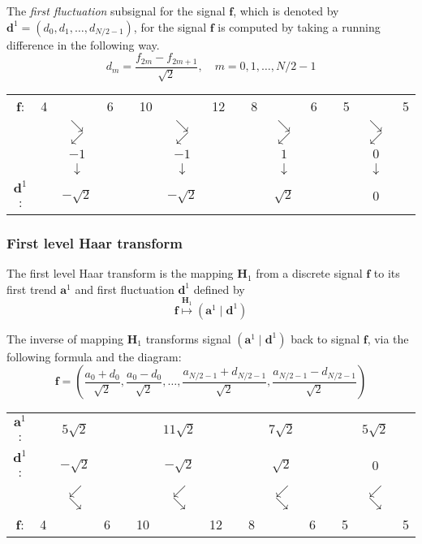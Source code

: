 \documentclass[a4paper,11pt]{report}
\begin{document}
The \emph{first fluctuation} subsignal for the signal $\mathbf{f}$, which is denoted by $\mathbf{d}^{1} = (d_{0},d_{1},\ldots,d_{N/2-1})$, for the signal $\mathbf{f}$ is computed by taking a running difference in the following way.
\begin{equation} \label{dm}
d_{m} = \frac{f_{2m} - f_{2m+1}}{\sqrt{2}}, \quad m=0,1,\ldots,N/2-1
\end{equation}
\begin{center}
\begin{tabular}{cccccccccccccccc}
$\mathbf{f}$: & 4 & & 6 & & 10 & & 12 & & 8 & & 6 & & 5 & & 5 \\
 &   & $\searrow$$\swarrow$ & & & & $\searrow$$\swarrow$ & & & & $\searrow$$\swarrow$ & & & & $\searrow$$\swarrow$ &  \\
 &   & $-1$ & & & & $-1$ & & & & $1$ & & & & $0$ &   \\
 &   & $\downarrow$ & & & & $\downarrow$ & & & & $\downarrow$ & & & & $\downarrow$ &  \\
$\mathbf{d}^{1}$: & & $-\sqrt{2}$ & & & & $-\sqrt{2}$ & & & & $\sqrt{2}$ & & & & $0$ &   
\end{tabular}
\end{center}

\subsubsection*{First level Haar transform}
The first level Haar transform is the mapping $\mathbf{H}_{1}$ from a discrete signal $\mathbf{f}$ to its first trend $\mathbf{a}^{1}$ and first fluctuation $\mathbf{d}^{1}$ defined by
\begin{equation} \label{map}
\mathbf{f} \stackrel{\mathbf{H}_{1}}{\longmapsto} \left(\mathbf{a}^{1} \mid \mathbf{d}^{1}\right)
\end{equation}

The inverse of mapping $\mathbf{H}_{1}$ transforms signal $(\mathbf{a}^{1} \mid \mathbf{d}^{1})$ back to signal $\mathbf{f}$, via the following formula and the diagram:
\begin{equation} \label{invmap}
\mathbf{f} = \left(\frac{a_{0}+d_{0}}{\sqrt{2}},\frac{a_{0}-d_{0}}{\sqrt{2}},\ldots,\frac{a_{N/2-1}+d_{N/2-1}}{\sqrt{2}},\frac{a_{N/2-1} - d_{N/2-1}}{\sqrt{2}}\right)
\end{equation}
\begin{center}
\begin{tabular}{cccccccccccccccc}
$\mathbf{a}^{1}$: & & $5\sqrt{2}$ & & & & $11\sqrt{2}$ & & & & $7\sqrt{2}$ & & & & $5\sqrt{2}$ &   \\
$\mathbf{d}^{1}$: & & $-\sqrt{2}$ & & & & $-\sqrt{2}$ & & & & $\sqrt{2}$ & & & & $0$ &   \\
 &   & $\swarrow$$\searrow$ & & & & $\swarrow$$\searrow$ & & & & $\swarrow$$\searrow$ & & & & $\swarrow$$\searrow$ &  \\
$\mathbf{f}$: & 4 & & 6 & & 10 & & 12 & & 8 & & 6 & & 5 & & 5 
\end{tabular}
\end{center}
\end{document}
